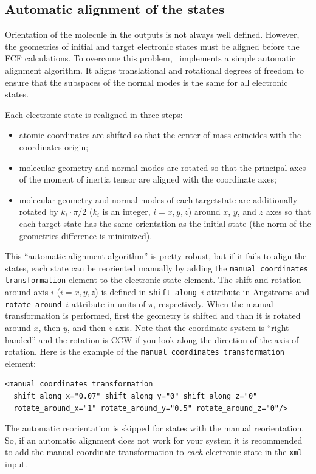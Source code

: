 \documentclass[11pt]{article}
\begin{document}
\subsection{Automatic alignment of the states}
\label{sec:alignment}

Orientation of the molecule in the \ai outputs is not always well defined. 
However, the geometries of initial 
and target electronic states must be aligned before the FCF calculations.
To overcome this problem, \ezFCF\ implements a simple automatic alignment algorithm. It aligns translational and rotational
degrees of freedom to ensure that the subspaces of the normal modes is the same for all electronic states.

Each electronic state is realigned in three steps:
\begin{itemize}
\item atomic coordinates are shifted so that the center of mass coincides with the coordinates origin;
\item molecular geometry and normal modes are rotated so that the principal axes of the moment of inertia 
tensor are aligned with the coordinate axes;
\item molecular geometry and normal modes of each \ul{target}{state} are additionally rotated by 
$k_i\cdot\pi/2$ ($k_i$ is an integer, $i={x,y,z}$) around $x$, $y$, and $z$ axes so that each target state has the same orientation 
as the initial state (the norm of the geometries difference is minimized).
\end{itemize}

This ``automatic alignment algorithm'' is pretty robust, but if it fails to align the states, each state can be reoriented 
manually by adding the {\tt manual coordinates transformation} element to the 
electronic state element.
The shift and rotation around axis $i$ ($i={x,y,z}$) is defined in {\tt shift along $i$} attribute in Angstroms
and {\tt rotate around $i$} attribute in units of $\pi$, respectively. 
When the manual transformation is performed, first the geometry is shifted and than it is rotated around $x$, then $y$, and then $z$ axis. 
Note that the coordinate system is ``right-handed'' and the rotation is CCW if you look along the 
direction of the axis of rotation. 
Here is the example of the {\tt manual coordinates transformation} element:
\begin{lstlisting}[frame=single,framerule=0pt]
<manual_coordinates_transformation 
  shift_along_x="0.07" shift_along_y="0" shift_along_z="0" 
  rotate_around_x="1" rotate_around_y="0.5" rotate_around_z="0"/>
\end{lstlisting}
The automatic reorientation is skipped for states with the manual reorientation.
So, if an automatic alignment does not work for your system it is recommended to add the
manual coordinate transformation to {\em each} electronic state in the {\tt xml} input.
\end{document}
